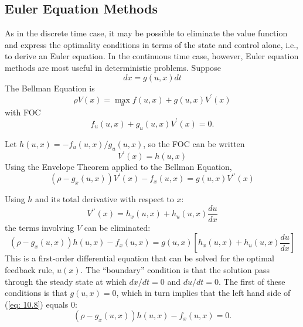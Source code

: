 \documentclass[\topdir/lecture\_notes.tex]{subfiles}
\begin{document}
\subsection{Euler Equation Methods}
As in the discrete time case, it may be possible to eliminate the value function and express the optimality conditions in terms of the state and control alone, i.e., to derive an Euler equation. In the continuous time case, however, Euler equation methods are most useful in deterministic problems.
Suppose
\begin{equation*}
dx=g(u, x) dt
\end{equation*}
The Bellman Equation is
\begin{equation*}
\rho V(x)=\max_{u} f(u, x)+g(u, x) V^{\prime}(x)
\end{equation*}
with FOC
\begin{equation*}
f_{u}(u, x)+g_{u}(u, x) V^{\prime}(x)=0.
\end{equation*}

Let $h(u, x)=-f_{u}(u, x) / g_{u}(u, x)$, so the FOC can be written
\begin{equation}
V^{\prime}(x)=h(u, x) \label{eq: 10.7}
\end{equation}
Using the Envelope Theorem applied to the Bellman Equation,
\begin{equation*}
\left(\rho-g_{x}(u, x)\right) V^{\prime}(x)-f_{x}(u, x)=g(u, x) V^{\prime \prime}(x)
\end{equation*}

Using $h$ and its total derivative with respect to $x$:
\begin{equation*}
V^{\prime \prime}(x)=h_{x}(u, x)+h_{u}(u, x) \frac{du}{dx}
\end{equation*}
the terms involving $V$ can be eliminated:
\begin{equation}
(\rho-g_{x}(u, x)) h(u, x)-f_{x}(u, x)=g(u, x)\left[h_{x}(u, x)+h_{u}(u, x) \frac{du}{dx}\right] \label{eq: 10.8}
\end{equation}
This is a first-order differential equation that can be solved for the optimal feedback rule, $u(x)$. The ``boundary'' condition is that the solution pass through the steady state at which $dx/dt=0$ and $du/dt=0$. The first of these conditions is that $g(u,x)=0$, which in turn implies that the left hand side of (\ref{eq: 10.8}) equals $0$:
\begin{equation*}
(\rho-g_{x}(u, x)) h(u, x)-f_{x}(u, x)=0.
\end{equation*}

\end{document}
